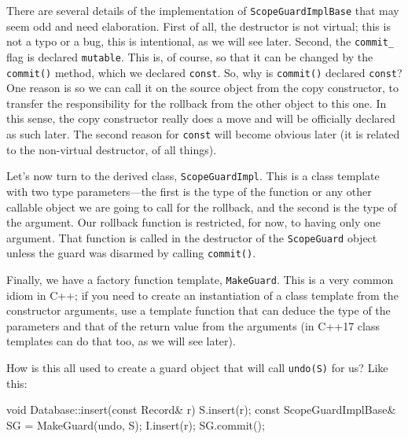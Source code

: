 There are several details of the implementation of \texttt{ScopeGuardImplBase} that may seem odd and need elaboration. First of all, the destructor is not virtual; this is not a typo or a bug, this is intentional, as we will see later. Second, the \texttt{commit\_} flag is declared \texttt{mutable}. This is, of course, so that it can be changed by the \texttt{commit()} method, which we declared \texttt{const}. So, why is \texttt{commit()} declared \texttt{const}? One reason is so we can call it on the source object from the copy constructor, to transfer the responsibility for the rollback from the other object to this one. In this sense, the copy constructor really does a move and will be officially declared as such later. The second reason for \texttt{const} will become obvious later (it is related to the non-virtual destructor, of all things).

Let's now turn to the derived class, \texttt{ScopeGuardImpl}. This is a class template with two type parameters---the first is the type of the function or any other callable object we are going to call for the rollback, and the second is the type of the argument. Our rollback function is restricted, for now, to having only one argument. That function is called in the destructor of the \texttt{ScopeGuard} object unless the guard was disarmed by calling \texttt{commit()}.

Finally, we have a factory function template, \texttt{MakeGuard}. This is a very common idiom in C++; if you need to create an instantiation of a class template from the constructor arguments, use a template function that can deduce the type of the parameters and that of the return value from the arguments (in C++17 class templates can do that too, as we will see later).

How is this all used to create a guard object that will call \texttt{undo(S)} for us? Like this:

\begin{code}
void Database::insert(const Record& r) {
  S.insert(r);
  const ScopeGuardImplBase& SG = MakeGuard(undo, S);
  I.insert(r);
  SG.commit();
}
\end{code}


